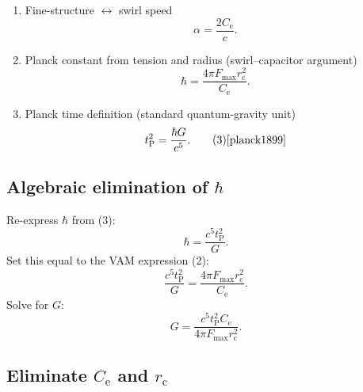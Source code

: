 \documentclass[a4paper,12pt]{article}
\begin{document}
\begin{enumerate}
    \item Fine-structure $\leftrightarrow$ swirl speed
    \begin{equation}
        \alpha = \frac{2C_{\mathrm{e}}}{c}. \tag{1}
    \end{equation}

    \item Planck constant from tension and radius (swirl–capacitor argument)
    \begin{equation}
        \hbar = \frac{4\pi F_{\max} r_{\mathrm{c}}^{2}}{C_{\mathrm{e}}}. \tag{2}
    \end{equation}

    \item Planck time definition (standard quantum-gravity unit)
    \begin{equation}
        t_{\mathrm{P}}^{2}= \frac{\hbar G}{c^{5}}. \tag{3}\hfill\text{\cite{planck1899}}
    \end{equation}
\end{enumerate}

\subsection{Algebraic elimination of $\hbar$}

Re-express $\hbar$ from (3):
\begin{equation}
    \hbar = \frac{c^{5} t_{\mathrm{P}}^{2}}{G}. \tag{4}
\end{equation}
Set this equal to the VAM expression (2):
\begin{equation}
    \frac{c^{5} t_{\mathrm{P}}^{2}}{G}
    = \frac{4\pi F_{\max} r_{\mathrm{c}}^{2}}{C_{\mathrm{e}}}.
\end{equation}
Solve for $G$:
\begin{equation}
    G = \frac{c^{5} t_{\mathrm{P}}^{2} C_{\mathrm{e}}}{4\pi F_{\max} r_{\mathrm{c}}^{2}}. \tag{5}
\end{equation}

\subsection{Eliminate $C_{\mathrm{e}}$ and $r_{\mathrm{c}}$}
\end{document}
